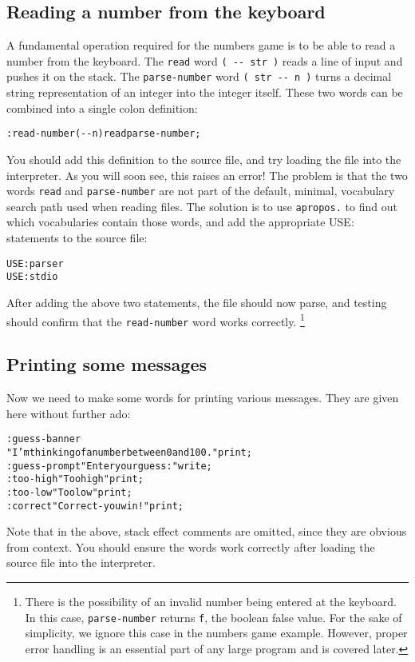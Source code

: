 \documentclass[english]{article}
\begin{document}
\subsection{Reading a number from the keyboard}

A fundamental operation required for the numbers game is to be able
to read a number from the keyboard. The \texttt{read} word \texttt{(
-{}- str )} reads a line of input and pushes it on the stack.
The \texttt{parse-number} word \texttt{( str -{}- n )} turns a decimal
string representation of an integer into the integer itself. These
two words can be combined into a single colon definition:

\begin{alltt}
: read-number ( -{}- n ) read parse-number ;
\end{alltt}
You should add this definition to the source file, and try loading
the file into the interpreter. As you will soon see, this raises an
error! The problem is that the two words \texttt{read} and \texttt{parse-number}
are not part of the default, minimal, vocabulary search path used
when reading files. The solution is to use \texttt{apropos.} to find
out which vocabularies contain those words, and add the appropriate
USE: statements to the source file:

\begin{alltt}
USE: parser
USE: stdio
\end{alltt}
After adding the above two statements, the file should now parse,
and testing should confirm that the \texttt{read-number} word works correctly.%
\footnote{There is the possibility of an invalid number being entered at the
keyboard. In this case, \texttt{parse-number} returns \texttt{f},
the boolean false value. For the sake of simplicity, we ignore this
case in the numbers game example. However, proper error handling is
an essential part of any large program and is covered later.%
}


\subsection{Printing some messages}

Now we need to make some words for printing various messages. They
are given here without further ado:

\begin{alltt}
: guess-banner
    "I'm thinking of a number between 0 and 100." print ;
: guess-prompt "Enter your guess: " write ;
: too-high "Too high" print ;
: too-low "Too low" print ;
: correct "Correct - you win!" print ;
\end{alltt}
Note that in the above, stack effect comments are omitted, since they
are obvious from context. You should ensure the words work correctly
after loading the source file into the interpreter.
\end{document}
